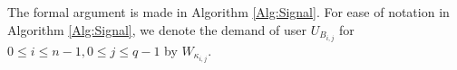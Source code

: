 \documentclass[journal,twocolumn]{IEEEtran}
\theoremstyle{definition}
\newcommand{\calP}{\mathcal{P}}
\newcommand{\calS}{\mathcal{S}}
\begin{document}
The formal argument is made in Algorithm \ref{Alg:Signal}. For ease of notation in Algorithm \ref{Alg:Signal}, we denote the demand of user $U_{B_{i,j}}$ for $0 \leq i \leq n-1,0 \leq j \leq q-1$ by $W_{\kappa_{i,j}}$.

\end{document}
